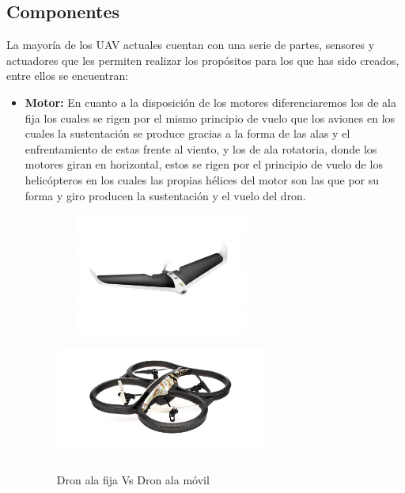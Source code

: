\subsection{Componentes}
\hspace{1cm} La mayoría de los UAV actuales cuentan con una serie de partes, sensores y actuadores que les permiten realizar los propósitos para los que has sido creados, entre ellos se encuentran: 
	\begin{itemize}
		\item \textbf{Motor:} En cuanto a la disposición de los motores diferenciaremos los de ala fija los cuales se rigen por el mismo principio de vuelo que los aviones en los cuales la sustentación se produce gracias a la forma de las alas y el enfrentamiento de estas frente al viento, y los de ala rotatoria, donde los motores giran en horizontal, estos se rigen por el principio de vuelo de los helicópteros en los cuales las propias hélices del motor son las que por su forma y giro producen la sustentación y el vuelo del dron.
		 		
\begin{figure}[H]
 \centering
    \includegraphics[width=7cm,height=4cm]{imag/IMG15.jpeg}
    \includegraphics[width=7cm,height=4cm]{imag/IMG16.jpeg}
 \caption{Dron ala fija Vs Dron ala móvil}
 \label{f:Tipos de Dron}
\end{figure}


\end{itemize}

